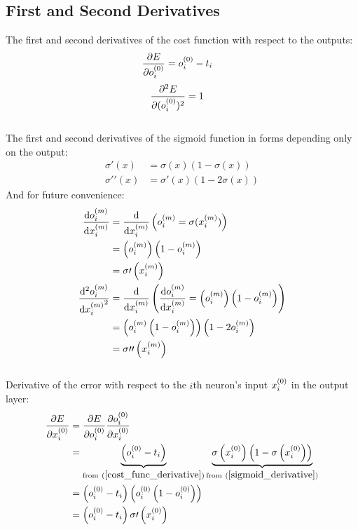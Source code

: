 \subsection{First and Second Derivatives} 
The first and second derivatives of the cost function with respect to the outputs:
\begin{align}
\pdv{E}{o_{i}^{(0)}} &= o_{i}^{(0)} - t_{i} \label{cost_func_derivative}
\end{align}
\begin{align}
\pdv[2]{E}{(o_{i}^{(0)})} &= 1\label{cost_func_2nd_derivative}
\end{align}
\\[5pt]
The first and second derivatives of the sigmoid function in forms depending only on the output:
\begin{align}
\sigma\prime(x) &= \sigma(x)\left(1 - \sigma(x)\right)\label{sigmoid_derivative} 
\\
\sigma\prime\prime(x) &= \sigma\prime(x)\left(1 - 2\sigma(x)\right) \label{sigmoid_2nd_derivative}
\end{align}
And for future convenience: 
\begin{align}
\dv{o_{i}^{(m)}}{x_{i}^{(m)}} &= 
\dv{}{x_{i}^{(m)}}\left({o_{i}^{(m)}} = \sigma(x_{i}^{(m)})\right) 
\\
&= \left(o_{i}^{(m)}\right)\left(1 - o_{i}^{(m)}\right)
\\
&= \sigma\prime\left(x_{i}^{(m)}\right)
\\
\dv[2]{{o_{i}^{(m)}}}{{x_{i}^{(m)}}} &=
\dv{}{{x_{i}^{(m)}}}\left(\dv{o_{i}^{(m)}}{x_{i}^{(m)}} = \left(o_{i}^{(m)}\right)\left(1 - o_{i}^{(m)}\right)\right)
\\
&= \left(o_{i}^{(m)}\left(1 - o_{i}^{(m)}\right)\right)\left(1 - 2o_{i}^{(m)}\right)
\\
&= \sigma\prime\prime\left(x_{i}^{(m)}\right)
\end{align}
\\[5pt]Derivative of the error with respect to the $i$th neuron's input $x_{i}^{(0)}$ in the output layer:
\begin{align}
\pdv{E}{\Input i 0} &= \pdv{E}{\Out i 0} \pdv{\Out i 0}{\Input i 0} 
\\
&= \underbrace{\left(\Out i 0 - \Target i\right)}_{\text{from} \ (\ref{cost_func_derivative})} \underbrace{\sigma\left(\Input i 0\right)\left(1 - \sigma\left(\Input i 0\right)\right)}
_{\text{from} \ (\ref{sigmoid_derivative})}
\\
&= \left(\Out i 0 - \Target i\right)\left(\Out i 0 \left(1 - \Out i 0\right)\right)
\\
&= \left(\Out i 0 - \Target i\right)\sigma\prime\left(\Input i 0\right)\label{dedx}
\end{align}
